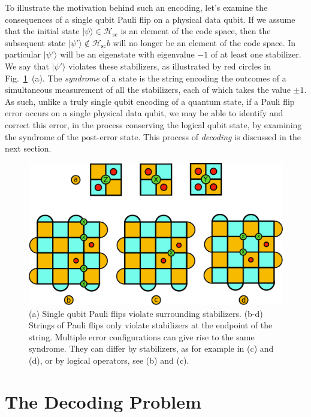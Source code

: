 \documentclass[twocolumn,preprintnumbers,amsmath,amssymb,notitlepage,nofootinbib,longbibliography,superscriptaddress,aps,pra,10pt]{revtex4-1}
\begin{document}
	To illustrate the motivation behind such an encoding, let's examine the consequences of a single qubit Pauli flip on a physical data qubit.
	If we assume that the initial state $|\psi\rangle \in \mathcal{H}_\mathrm{sc}$ is an element of the code space, then the subsequent state $|\psi'\rangle \not \in \mathcal{H}_\mathrm{sc}b$ will no longer be an element of the code space.
	In particular $|\psi'\rangle$ will be an eigenstate with eigenvalue $-1$ of at least one stabilizer.
	We say that $|\psi'\rangle$ violates these stabilizers, as illustrated by red circles in Fig.~\ref{f:surface_code_examples}~(a).
	The \textit{syndrome} of a state is the string encoding the outcomes of a simultaneous measurement of all the stabilizers, each of which takes the value $\pm 1$.
	As such, unlike a truly single qubit encoding of a quantum state, if a Pauli flip error occurs on a single physical data qubit, we may be able to identify and correct this error, in the process conserving the logical qubit state, by examining the syndrome of the post-error state. 
	This process of \textit{decoding} is discussed in the next section.

	\begin{figure}
		\centering
		\includegraphics[width=1\linewidth]{figures/surface_code_examples.pdf}
		\caption{
			(a) Single qubit Pauli flips violate surrounding stabilizers.
			(b-d) Strings of Pauli flips only violate stabilizers at the endpoint of the string.
			Multiple error configurations can give rise to the same syndrome.
			They can differ by stabilizers, as for example in (c) and (d), or by logical operators, see (b) and (c).
		}
		\label{f:surface_code_examples}
	\end{figure}

\section{The Decoding Problem}\label{s:the_decoding_problem}
\end{document}
